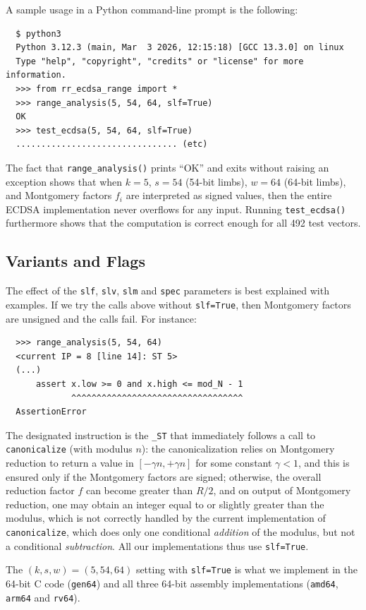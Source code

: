 \documentclass{llncs}
\begin{document}
A sample usage in a Python command-line prompt is the following:
{\small\begin{verbatim}
  $ python3
  Python 3.12.3 (main, Mar  3 2026, 12:15:18) [GCC 13.3.0] on linux
  Type "help", "copyright", "credits" or "license" for more information.
  >>> from rr_ecdsa_range import *
  >>> range_analysis(5, 54, 64, slf=True)
  OK
  >>> test_ecdsa(5, 54, 64, slf=True)
  ................................ (etc)
\end{verbatim}}
The fact that \verb+range_analysis()+ prints ``OK'' and exits without
raising an exception shows that when $k = 5$, $s = 54$ (54-bit limbs),
$w = 64$ (64-bit limbs), and Montgomery factors $f_i$ are interpreted
as signed values, then the entire ECDSA implementation never overflows
for any input. Running \verb+test_ecdsa()+ furthermore shows that the
computation is correct enough for all 492 test vectors.

\subsection{Variants and Flags}\label{sec:range:variants}

The effect of the \verb+slf+, \verb+slv+, \verb+slm+ and \verb+spec+
parameters is best explained with examples. If we try the calls above
without \verb+slf=True+, then Montgomery factors are unsigned and the
calls fail. For instance:
{\small\begin{verbatim}
  >>> range_analysis(5, 54, 64)
  <current IP = 8 [line 14]: ST 5>
  (...)
      assert x.low >= 0 and x.high <= mod_N - 1
             ^^^^^^^^^^^^^^^^^^^^^^^^^^^^^^^^^^
  AssertionError
\end{verbatim}}
The designated instruction is the \verb+_ST+ that immediately follows
a call to \verb+canonicalize+ (with modulus $n$): the canonicalization
relies on Montgomery reduction to return a value in $[-\gamma n, +\gamma n]$
for some constant $\gamma < 1$, and this is ensured only if the Montgomery
factors are signed; otherwise, the overall reduction factor $f$ can become
greater than $R/2$, and on output of Montgomery reduction, one may obtain
an integer equal to or slightly greater than the modulus, which is not
correctly handled by the current implementation of \verb+canonicalize+,
which does only one conditional \emph{addition} of the modulus, but not
a conditional \emph{subtraction}. All our implementations thus use
\verb+slf=True+.

The $(k, s, w) = (5, 54, 64)$ setting with \verb+slf=True+ is what we
implement in the 64-bit C code (\verb+gen64+) and all three 64-bit
assembly implementations (\verb+amd64+, \verb+arm64+ and \verb+rv64+).
\end{document}
